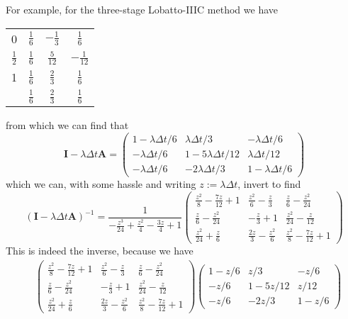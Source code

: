 \documentclass[10pt,a4paper]{article}
\newcommand{\half}[0]{\frac{1}{2}}
\newcommand{\bvec}[1]{\mathbf{#1}}
\begin{document}
For example, for the three-stage Lobatto-IIIC method we have
\begin{table}[h]
  \centering
  \begin{tabular}{c|ccc}
    0 & $\frac{1}{6}$ & $-\frac{1}{3}$ & $\frac{1}{6}$ \\
    $\half$ & $\frac{1}{6}$ & $\frac{5}{12}$ & $-\frac{1}{12}$ \\
    1 & $\frac{1}{6}$ & $\frac{2}{3}$ & $\frac{1}{6}$ \\
\hline
    {} & $\frac{1}{6}$ & $\frac{2}{3}$ & $\frac{1}{6}$ \\
  \end{tabular}
\end{table}
from which we can find that
\begin{equation*}
  \bvec{I} - \lambda \Delta t \bvec{A} =
  \begin{pmatrix}
    1 - \lambda \Delta t/6 & \lambda \Delta t/3 & -\lambda \Delta t/6 \\
    -\lambda \Delta t/6 & 1 - 5\lambda \Delta t/12 & \lambda \Delta t/12 \\
    -\lambda \Delta t/6 & -2\lambda \Delta t/3 & 1 - \lambda \Delta t/6
  \end{pmatrix}
\end{equation*}
which we can, with some hassle and writing $z:=\lambda \Delta t$, invert to find
\begin{equation*}
  (\bvec{I} - \lambda \Delta t \bvec{A})^{-1} =
  \frac{1}{-\frac{z^3}{24} + \frac{z^2}{4}-\frac{3z}{4}+1}
  \begin{pmatrix}
    \frac{z^2}{8} - \frac{7z}{12}+1 & \frac{z^2}{6} - \frac{z}{3} & \frac{z}{6} - \frac{z^2}{24} \\
    \frac{z}{6} - \frac{z^2}{24} & -\frac{z}{3} + 1 & \frac{z^2}{24} - \frac{z}{12} \\
    \frac{z^2}{24} + \frac{z}{6} & \frac{2z}{3} - \frac{z^2}{6} & \frac{z^2}{8} - \frac{7z}{12} + 1
  \end{pmatrix}
\end{equation*}
This is indeed the inverse, because we have
\begin{align*}
  &\begin{pmatrix}
     \frac{z^2}{8} - \frac{7z}{12}+1 & \frac{z^2}{6} - \frac{z}{3} & \frac{z}{6} - \frac{z^2}{24} \\
    \frac{z}{6} - \frac{z^2}{24} & -\frac{z}{3} + 1 & \frac{z^2}{24} - \frac{z}{12} \\
    \frac{z^2}{24} + \frac{z}{6} & \frac{2z}{3} - \frac{z^2}{6} & \frac{z^2}{8} - \frac{7z}{12} + 1
  \end{pmatrix}
  \begin{pmatrix}
    1 - z/6 & z/3 & -z/6 \\
    -z/6 & 1-5z/12 & z/12 \\
    -z/6 & -2z/3 & 1 - z/6
  \end{pmatrix}
\end{align*}
\end{document}
